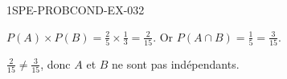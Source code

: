 \begin{corrige}{1SPE-PROBCOND-EX-032}

$P(A) \times P(B) = \frac{2}{5} \times \frac{1}{3} = \frac{2}{15}$. Or $P(A \cap B) = \frac{1}{5} = \frac{3}{15}$.

$\frac{2}{15}
\neq \frac{3}{15}$, donc $A$ et $B$ ne sont pas indépendants.

\end{corrige}
